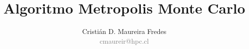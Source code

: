 \documentclass{beamer}
\author[Cristián D. Maureira Fredes]{\large Cristián D. Maureira Fredes\\\normalsize \textcolor{gray}{cmaureir@hpc.cl}}
\title[Algoritmo Metropolis]{\Huge Algoritmo Metropolis Monte Carlo}
\subtitle{}
\institute{Universidad Técnica\\ Federico Santa María}
\begin{document}
\begin{frame}[t,plain]
\titlepage
\end{frame}





\begin{frame}[t,plain]
\titlepage
\end{frame}
\end{document}
